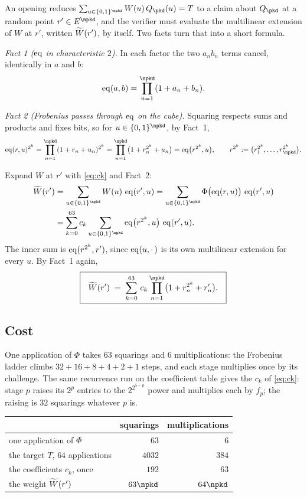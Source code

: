 An opening reduces $\sum_{u\in\cube{\npkd}}W(u)\,Q_\pkd(u)=T$ to a claim about $Q_\pkd$ at a random point $r'\in\E^{\npkd}$, and the verifier must evaluate the multilinear extension of $W$ at $r'$, written $\widetilde{W}(r')$, by itself. Two facts turn that into a short formula.

\emph{Fact 1 ($\operatorname{eq}$ in characteristic $2$).} In each factor the two $a_nb_n$ terms cancel, identically in $a$ and $b$:
\[
\eq(a,b)=\prod_{n=1}^{\npkd}(1+a_n+b_n).
\]

\emph{Fact 2 (Frobenius passes through $\operatorname{eq}$ on the cube).} Squaring respects sums and products and fixes bits, so for $u\in\cube{\npkd}$, by Fact~1,
\[
\eq(r,u)^{2^k}=\prod_{n=1}^{\npkd}(1+r_n+u_n)^{2^k}=\prod_{n=1}^{\npkd}\bigl(1+r_n^{2^k}+u_n\bigr)=\eq\bigl(r^{2^k},u\bigr),
\qquad r^{2^k}:=\bigl(r_1^{2^k},\dots,r_{\npkd}^{2^k}\bigr).
\]

Expand $W$ at $r'$ with \eqref{eq:ck} and Fact~2:
\[
\begin{aligned}
\mle{W}(r')&=\sum_{u\in\cube{\npkd}}W(u)\,\eq(r',u)
=\sum_{u\in\cube{\npkd}}\Phi\bigl(\eq(r,u)\bigr)\,\eq(r',u)\\
&=\sum_{k=0}^{63}c_k\sum_{u\in\cube{\npkd}}\eq\bigl(r^{2^k},u\bigr)\,\eq(r',u).
\end{aligned}
\]
The inner sum is $\operatorname{eq}(r^{2^k},r')$, since $\operatorname{eq}(u,\cdot\,)$ is its own multilinear extension for every $u$. By Fact~1 again,
\[
\boxed{\ \
\mle{W}(r') \;=\; \sum_{k=0}^{63}\, c_k \prod_{n=1}^{\npkd}
\bigl( 1 + r_n^{2^k} + r'_n \bigr).
\ \ }
\]

\subsection{Cost}\label{rs:cost}

One application of $\Phi$ takes $63$ squarings and $6$ multiplications: the Frobenius ladder climbs $32+16+8+4+2+1$ steps, and each stage multiplies once by its challenge. The same recurrence run on the coefficient table gives the $c_k$ of \eqref{eq:ck}: stage $p$ raises its $2^p$ entries to the $2^{2^{5-p}}$ power and multiplies each by $f_p$; the raising is $32$ squarings whatever $p$ is.

\begin{center}
\begin{tabular}{lrr}
& squarings & multiplications\\[2pt]
\hline
one application of $\Phi$ & $63$ & $6$\\
the target $T$, $64$ applications & $4032$ & $384$\\
the coefficients $c_k$, once & $192$ & $63$\\
the weight $\widetilde{W}(r')$ & $63\npkd$ & $64\npkd$\\
\end{tabular}
\end{center}

